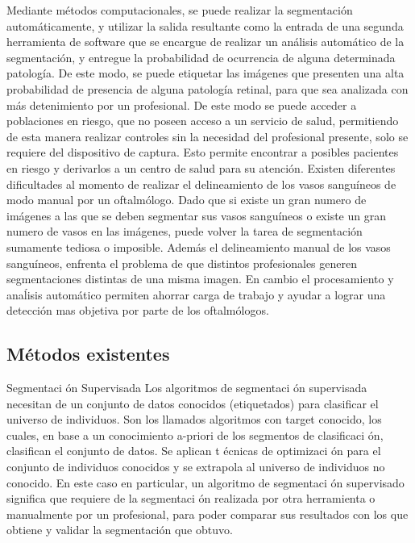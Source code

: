  
Mediante m\'etodos computacionales, se puede realizar la segmentación autom\'aticamente, y utilizar la salida resultante como la entrada de una segunda herramienta de software que se encargue de  realizar un an\'alisis autom\'atico de la segmentaci\'on, y entregue la probabilidad de ocurrencia de alguna determinada patolog\'ia. De este modo, se puede etiquetar las im\'agenes que presenten una alta  probabilidad de presencia de alguna patolog\'ia retinal, para que sea analizada con m\'as detenimiento por un profesional. De este modo se puede acceder a poblaciones en riesgo, que no poseen acceso a un servicio de salud, permitiendo de esta manera realizar controles sin la necesidad del profesional presente, solo se requiere del dispositivo de captura. Esto permite encontrar a posibles pacientes en riesgo y derivarlos a un centro de salud para su atenci\'on. 
Existen diferentes dificultades al momento de realizar el delineamiento de los vasos sangu\'ineos de modo manual por un oftalm\'ologo. Dado que si existe un gran numero de im\'agenes a las que se deben segmentar sus vasos sangu\'ineos o existe un gran numero de vasos en las im\'agenes, puede volver la tarea de segmentaci\'on sumamente tediosa o imposible. Adem\'as el delineamiento manual de los vasos sangu\'ineos, enfrenta el problema de que distintos profesionales generen segmentaciones distintas de una misma imagen. En cambio el procesamiento y ana\'lisis autom\'atico permiten ahorrar carga de trabajo y ayudar a lograr una detecci\'on mas objetiva por parte de los oftalm\'ologos. 

\subsection{M\'etodos existentes}
Segmentaci \'on Supervisada
Los algoritmos de segmentaci \'on supervisada necesitan de un conjunto de datos conocidos (etiquetados) para clasificar el universo de individuos. Son los llamados algoritmos con target conocido, los cuales, en base a un conocimiento a-priori de los segmentos de clasificaci \'on, clasifican el conjunto de datos. Se aplican t \'ecnicas de optimizaci \'on para el conjunto de individuos conocidos y se extrapola al universo de individuos no conocido. En este caso en particular, un algoritmo de segmentaci \'on supervisado significa que requiere de la segmentaci \'on realizada por otra herramienta o manualmente por un profesional, para poder comparar sus resultados con los que obtiene y validar la segmentación que obtuvo.

